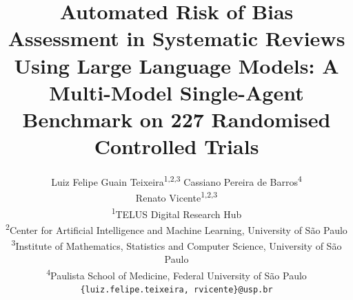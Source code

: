 \documentclass[12pt,a4paper]{article}
\begin{document}
\title{\textbf{Automated Risk of Bias Assessment in Systematic Reviews
Using Large Language Models: A Multi-Model Single-Agent Benchmark
on 227 Randomised Controlled Trials}}

\author{
  Luiz Felipe Guain Teixeira\textsuperscript{1,2,3}\quad
  Cassiano Pereira de Barros\textsuperscript{4}\quad \\
  Renato Vicente\textsuperscript{1,2,3}
  \\[6pt]
  \small\textsuperscript{1}TELUS Digital Research Hub\\
  \small\textsuperscript{2}Center for Artificial Intelligence and Machine Learning, University of São Paulo\\
  \small\textsuperscript{3}Institute of Mathematics, Statistics and Computer Science, University of São Paulo\\[2pt]
  \small\textsuperscript{4}Paulista School of Medicine, Federal University of São Paulo\\[2pt]
  \small \texttt{\{luiz.felipe.teixeira, rvicente\}@usp.br}
}

\date{}
\maketitle
\thispagestyle{empty}
\end{document}
